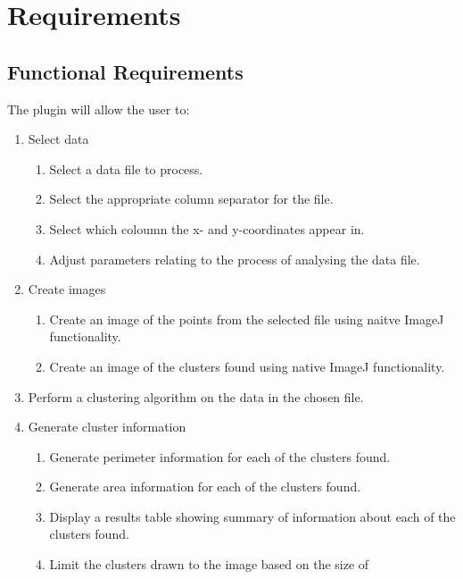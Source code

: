 
\onecolumn
\section{Requirements}
\label{sec:requirements}


\subsection{Functional Requirements}
\label{sub:functional_requirements}

The plugin will allow the user to:

\begin{enumerate}
	\item Select data
		\begin{enumerate}
			\item Select a data file to process.
			\item Select the appropriate column separator for the file.
			\item Select which coloumn the x- and y-coordinates appear in.
			\item Adjust parameters relating to the process of analysing the
				data file.
		\end{enumerate}
	\item Create images
		\begin{enumerate}
			\item Create an image of the points from the selected file using
				naitve ImageJ functionality.
			\item Create an image of the clusters found using native ImageJ
				functionality.
		\end{enumerate}
	\item Perform a clustering algorithm on the data in the chosen file.
	\item Generate cluster information
		\begin{enumerate}
			\item Generate perimeter information for each of the clusters
				found.
			\item Generate area information for each of the clusters found.
			\item Display a results table showing summary of information about
				each of the clusters found.
			\item Limit the clusters drawn to the image based on the size of

\end{enumerate}
\end{enumerate}
